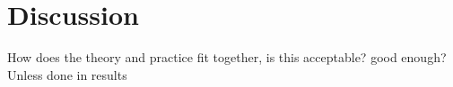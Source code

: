 \chapter{Discussion}
How does the theory and practice fit together, is this acceptable? good enough? Unless done in results
